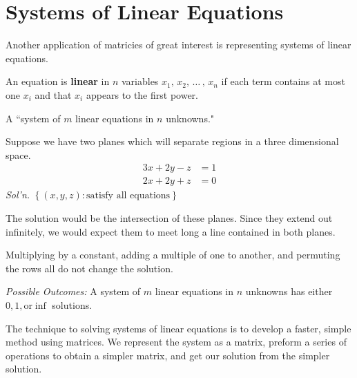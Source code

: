 \documentclass[../main.tex]{subfiles}
\begin{document}

\section{Systems of Linear Equations}

Another application of matricies of great interest is representing systems of linear equations.

\begin{definition}[Linear]
    An equation is \textbf{linear} in \( n \) variables \( x_1, \, x_2, \,  \dots \, ,\,  x_n \)
    if each term contains at most one \( x_i \) and that \( x_i \) appears to the first power.
\end{definition}

A ``system of \( m \) linear equations in \( n \) unknowns."

\begin{example}
    Suppose we have two planes which will separate regions in a three dimensional space.
    \[ \begin{aligned}
        3x + 2y - z &= 1 \\
        2x + 2y + z & = 0
    \end{aligned} \]
    \textit{Sol'n.} \( \left\{ (x,y,z) : \text{satisfy all equations} \right\} \)
    
    The solution would be the intersection of these planes.
    Since they extend out infinitely, we would expect them to meet long a line contained in both planes.
\end{example}

\begin{note}
    Multiplying by a constant, adding a multiple of one to another, and permuting the rows all do not change the solution.
\end{note}

\emph{Possible Outcomes:} A system of \( m \) linear equations in \( n \) unknowns has either \( 0, 1, \text{or} \inf \) solutions.

The technique to solving systems of linear equations is to develop a faster, simple method using matrices.
We represent the system as a matrix, preform a series of operations to obtain a simpler matrix, and get our solution from the simpler solution.
\end{document}
